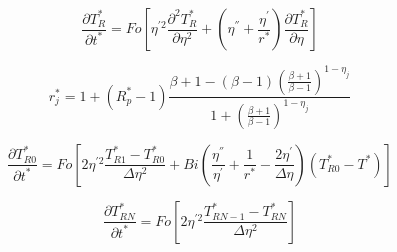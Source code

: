 \documentclass{article}
\begin{document}
\begin{equation} \frac{\partial T_R^*}{\partial t^* } = Fo \left[ \eta ^{'2} \frac{\partial^2 T_R^*}{\partial \eta^2} +
 \left(\eta^{''}+ \frac{\eta^{'}}{r^*} \right) \frac{\partial T_R^*}{\partial \eta } \right] \end{equation}

\begin{equation} r_j^* = 1+ \left(R_p^*-1 \right)  \frac{\beta+1-(\beta-1) \left( \frac{\beta+1}{\beta-1}\right)^{1-\eta_j}}{1+\left( \frac{\beta+1}{\beta-1}\right)^{1-\eta_j}}  \end{equation}

\begin{equation} \frac{\partial T_{R0}^*}{\partial t^*} = Fo\left[2\eta^{'2}\frac{T_{R1}^*-T_{R0}^*}{\Delta\eta^2}+Bi\left(\frac{\eta^{''}}{\eta^{'}}+ \frac{1}{r^*}-\frac{2\eta^{'}}{\Delta\eta} \right) \left(T_{R0}^* -T^*\right) \right]\end{equation}
 
\begin{equation} \frac{\partial T_{RN}^*}{\partial t^*} = Fo\left[2\eta^{'2}\frac{T_{RN-1}^*-T_{RN}^*}{\Delta\eta^2}  \right] \end{equation}
\end{document}
